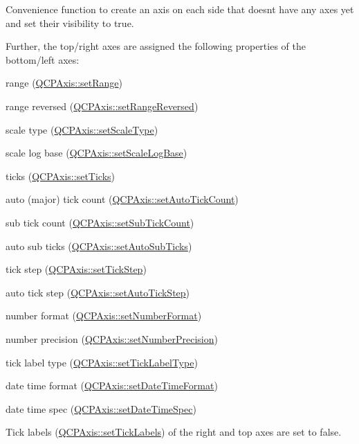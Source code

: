 Convenience function to create an axis on each side that doesn\textquotesingle{}t have any axes yet and set their visibility to true. 

Further, the top/right axes are assigned the following properties of the bottom/left axes\+:

\begin{DoxyItemize}
\item range (\hyperlink{classQCPAxis_aebdfea5d44c3a0ad2b4700cd4d25b641}{Q\+C\+P\+Axis\+::set\+Range}) \item range reversed (\hyperlink{classQCPAxis_a2172fdb196b1a0dc3f40992fcad8e9e1}{Q\+C\+P\+Axis\+::set\+Range\+Reversed}) \item scale type (\hyperlink{classQCPAxis_adef29cae617af4f519f6c40d1a866ca6}{Q\+C\+P\+Axis\+::set\+Scale\+Type}) \item scale log base (\hyperlink{classQCPAxis_a726186054be90487885a748aa1b42188}{Q\+C\+P\+Axis\+::set\+Scale\+Log\+Base}) \item ticks (\hyperlink{classQCPAxis_ac891409315bc379e3b1abdb162c1a011}{Q\+C\+P\+Axis\+::set\+Ticks}) \item auto (major) tick count (\hyperlink{classQCPAxis_a7c7111cbeac9ec5fcb40f93a1ef51a0b}{Q\+C\+P\+Axis\+::set\+Auto\+Tick\+Count}) \item sub tick count (\hyperlink{classQCPAxis_a4b1554ead9d7f9799650d51383e326dd}{Q\+C\+P\+Axis\+::set\+Sub\+Tick\+Count}) \item auto sub ticks (\hyperlink{classQCPAxis_adcbdec7a60054b88571e89599f4a45bf}{Q\+C\+P\+Axis\+::set\+Auto\+Sub\+Ticks}) \item tick step (\hyperlink{classQCPAxis_af727db0acc6492c4c774c0700e738205}{Q\+C\+P\+Axis\+::set\+Tick\+Step}) \item auto tick step (\hyperlink{classQCPAxis_a99fe77b034e06f5b723995beab96e741}{Q\+C\+P\+Axis\+::set\+Auto\+Tick\+Step}) \item number format (\hyperlink{classQCPAxis_ae585a54dc2aac662e90a2ca82f002590}{Q\+C\+P\+Axis\+::set\+Number\+Format}) \item number precision (\hyperlink{classQCPAxis_a21dc8023ad7500382ad9574b48137e63}{Q\+C\+P\+Axis\+::set\+Number\+Precision}) \item tick label type (\hyperlink{classQCPAxis_a54f24f5ce8feea25209388a863d7e448}{Q\+C\+P\+Axis\+::set\+Tick\+Label\+Type}) \item date time format (\hyperlink{classQCPAxis_a2ee0191daa03524a682113e63e05f7a7}{Q\+C\+P\+Axis\+::set\+Date\+Time\+Format}) \item date time spec (\hyperlink{classQCPAxis_a262e06731debed7eee11fa6a81d67eaf}{Q\+C\+P\+Axis\+::set\+Date\+Time\+Spec})\end{DoxyItemize}
Tick labels (\hyperlink{classQCPAxis_a04ba16e1f6f78d70f938519576ed32c8}{Q\+C\+P\+Axis\+::set\+Tick\+Labels}) of the right and top axes are set to false.

